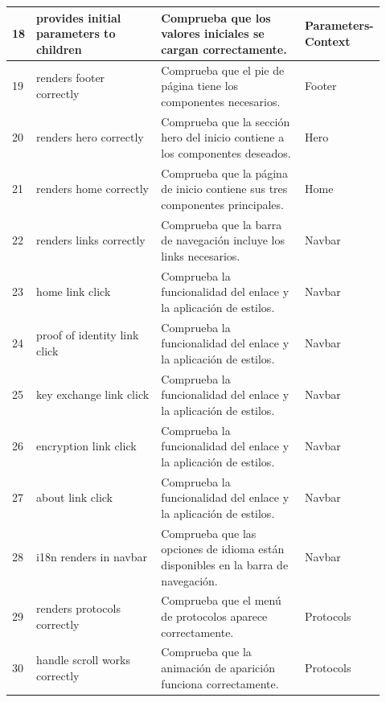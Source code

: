 \begin{longtable}{|p{0.02\linewidth}|p{0.35\linewidth}|p{0.4\linewidth}|p{0.15\linewidth}|}
    18 & provides initial parameters to children & Comprueba que los valores iniciales se cargan correctamente. & Parameters- Context  \\ \hline

    19 & renders footer correctly & Comprueba que el pie de página tiene los componentes necesarios. & Footer \\ \hline

    20 & renders hero correctly & Comprueba que la sección hero del inicio contiene a los componentes deseados. & Hero \\ \hline

    21 & renders home correctly & Comprueba que la página de inicio contiene sus tres componentes principales. & Home \\ \hline

    22 & renders links correctly & Comprueba que la barra de navegación incluye los links necesarios. & Navbar \\ \hline
    23 & home link click & Comprueba la funcionalidad del enlace y la aplicación de estilos. & Navbar \\ \hline
    24 & proof of identity link click & Comprueba la funcionalidad del enlace y la aplicación de estilos. & Navbar \\ \hline
    25 & key exchange link click & Comprueba la funcionalidad del enlace y la aplicación de estilos. & Navbar \\ \hline
    26 & encryption link click & Comprueba la funcionalidad del enlace y la aplicación de estilos. & Navbar \\ \hline
    27 & about link click & Comprueba la funcionalidad del enlace y la aplicación de estilos. & Navbar \\ \hline
    28 & i18n renders in navbar & Comprueba que las opciones de idioma están disponibles en la barra de navegación. & Navbar \\ \hline

    29 & renders protocols correctly & Comprueba que el menú de protocolos aparece correctamente. & Protocols \\ \hline
    30 & handle scroll works correctly & Comprueba que la animación de aparición funciona correctamente. & Protocols \\ \hline


\end{longtable}
